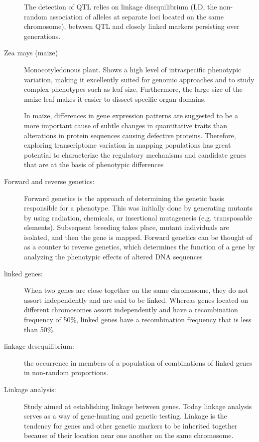 \documentclass[a4paper,10pt]{article}
\begin{document}
\begin{description}
The detection of QTL relies on linkage disequilibrium (LD, the non-random association of alleles at separate loci located on the same chromosome), between QTL and closely linked markers persisting over generations.

\item[Zea mays (maize)] Monocotyledonous plant. Shows a high level of intraspecific phenotypic variation, making
it excellently suited for genomic approaches and to
study complex phenotypes such as leaf size. Furthermore, the large size of the maize leaf makes it easier to
dissect specific organ domains.

In maize, differences in gene expression patterns are suggested to be a more important cause of subtle changes
in quantitative traits than alterations in protein sequences causing defective proteins.
Therefore, exploring transcriptome variation in mapping populations has great potential to characterize the regulatory mechanisms and candidate genes that are at the basis of phenotypic differences

\item[Forward and reverse genetics:] Forward genetics is the approach of determining the genetic basis responsible for a phenotype. 
This was initially done by generating mutants by using radiation, chemicals, or insertional mutagenesis (e.g. transposable elements). 
Subsequent breeding takes place, mutant individuals are isolated, and then the gene is mapped. 
Forward genetics can be thought of as a counter to reverse genetics, which determines the function of a gene by analyzing the phenotypic effects of altered DNA sequences

\item[linked genes:] When two genes are close together on the same chromosome, they do not assort independently and are said to be linked. 
Whereas genes located on different chromosomes assort independently and have a recombination frequency of 50\%, linked genes have a recombination frequency that is less than 50\%.

\item[linkage desequilibrium:] the occurrence in members of a population of combinations of linked genes in non-random proportions.

\item[Linkage analysis:] Study aimed at establishing linkage between genes. 
Today linkage analysis serves as a way of gene-hunting and genetic testing. Linkage is the tendency for genes and other genetic markers to be inherited together because of their location near one another on the same chromosome.


\end{description}
\end{document}
